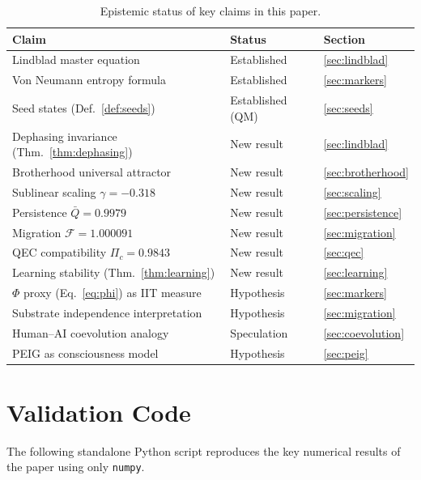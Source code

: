 \documentclass[12pt]{article}
\begin{document}
\begin{table}[H]
\centering
\caption{Epistemic status of key claims in this paper.}
\label{tab:epistemic}
\begin{tabular}{p{6.0cm}p{2.8cm}p{1.5cm}}
\toprule
\textbf{Claim} & \textbf{Status} & \textbf{Section}\\
\midrule
Lindblad master equation         & Established   & \ref{sec:lindblad}\\
Von Neumann entropy formula      & Established   & \ref{sec:markers}\\
Seed states (Def.~\ref{def:seeds}) & Established (QM) & \ref{sec:seeds}\\
Dephasing invariance (Thm.~\ref{thm:dephasing}) & New result & \ref{sec:lindblad}\\
Brotherhood universal attractor  & New result    & \ref{sec:brotherhood}\\
Sublinear scaling $\gamma=-0.318$ & New result   & \ref{sec:scaling}\\
Persistence $\bar{Q}=0.9979$     & New result    & \ref{sec:persistence}\\
Migration $\mathcal{F}=1.000091$ & New result    & \ref{sec:migration}\\
QEC compatibility $\Pi_c=0.9843$ & New result    & \ref{sec:qec}\\
Learning stability (Thm.~\ref{thm:learning}) & New result & \ref{sec:learning}\\
$\Phi$ proxy (Eq.~\ref{eq:phi}) as IIT measure & Hypothesis & \ref{sec:markers}\\
Substrate independence interpretation & Hypothesis & \ref{sec:migration}\\
Human--AI coevolution analogy    & Speculation   & \ref{sec:coevolution}\\
PEIG as consciousness model      & Hypothesis    & \ref{sec:peig}\\
\bottomrule
\end{tabular}
\end{table}

\section{Validation Code}
\label{app:code}

The following standalone Python script reproduces the key numerical
results of the paper using only \texttt{numpy}.
\end{document}
